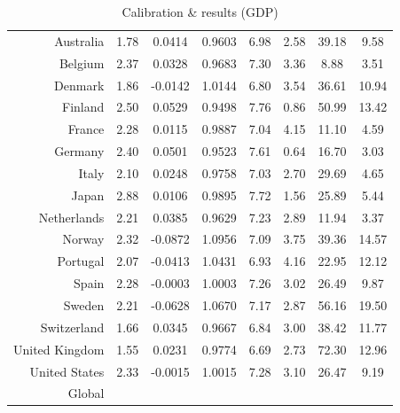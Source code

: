 {{{{{{{\begin{table}[H]
\begin{center}
\begin{tabular}{rccccccc}
Australia & 1.78 & 0.0414 & 0.9603 & 6.98 & 2.58 & 39.18 & 9.58\\ 

Belgium & 2.37 & 0.0328 & 0.9683 & 7.30 & 3.36 & 8.88 &  3.51\\ 

Denmark & 1.86 & -0.0142 & 1.0144 & 6.80 & 3.54 & 36.61 &  10.94\\ 

Finland & 2.50 & 0.0529 & 0.9498 & 7.76 & 0.86 & 50.99 &  13.42\\ 

France & 2.28 & 0.0115 & 0.9887 & 7.04 & 4.15 & 11.10 &  4.59\\ 

Germany & 2.40 & 0.0501 & 0.9523 & 7.61 & 0.64 & 16.70 &  3.03\\ 

Italy & 2.10 & 0.0248 & 0.9758 & 7.03 & 2.70 & 29.69 &  4.65\\ 

Japan & 2.88 & 0.0106 & 0.9895 & 7.72 & 1.56 & 25.89 &  5.44\\ 

Netherlands & 2.21 & 0.0385 & 0.9629 & 7.23 & 2.89 & 11.94 &  3.37\\ 

Norway & 2.32 & -0.0872 & 1.0956 & 7.09 & 3.75 & 39.36 &  14.57\\ 

Portugal & 2.07 & -0.0413 & 1.0431 & 6.93 & 4.16 & 22.95 &  12.12\\ 

Spain & 2.28 & -0.0003 & 1.0003 & 7.26 & 3.02 & 26.49 &  9.87\\ 

Sweden & 2.21 & -0.0628 & 1.0670 & 7.17 & 2.87 & 56.16 &  19.50\\ 

Switzerland & 1.66 & 0.0345 & 0.9667 & 6.84 & 3.00 & 38.42 &  11.77\\ 

United Kingdom & 1.55 & 0.0231 & 0.9774 & 6.69 & 2.73 & 72.30 &  12.96\\ 

United States & 2.33 & -0.0015 & 1.0015 & 7.28 & 3.10 & 26.47 &  9.19\\
\hline
Global & & & & & & &\\
\hline 
\hline
\end{tabular} 
\end{center}
\caption{Calibration \& results (GDP)}
\label{tab:results_GDP}
\end{table}

}}}}}}}

